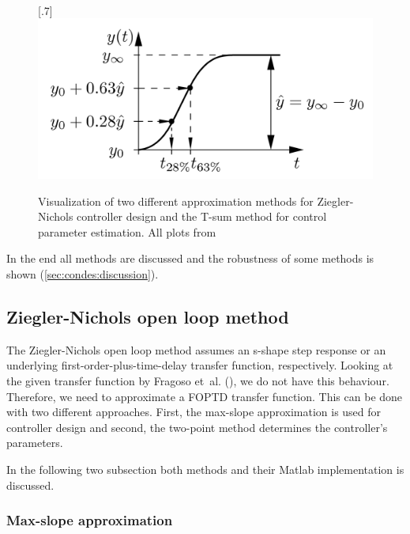 \begin{figure}[H]
\\
[.7\textwidth]{\includegraphics[width=1\linewidth]{fig/Dissli_Kienle_two_point_2023.png}}
    \caption{Visualization of two different approximation methods for Ziegler-Nichols controller design and the T-sum method for control parameter estimation. All plots from \cite{Dissli_Kienle_2023}}
    \label{fig:condes:different_methods}
\end{figure}



In the end all methods are discussed and the robustness of some methods is shown (\autoref{sec:condes:discussion}).



\subsection{Ziegler-Nichols open loop method}\label{sec:condes:ZN}

The Ziegler-Nichols open loop method assumes an s-shape step response or an underlying first-order-plus-time-delay transfer function, respectively.
Looking at the given transfer function by Fragoso et~al. (\cite[Table 2]{Fragoso_et_al_2017}), we do not have this behaviour.
Therefore, we need to approximate a FOPTD transfer function.
This can be done with two different approaches.
First, the max-slope approximation is used for controller design and second, the two-point method determines the controller's parameters.

In the following two subsection both methods and their Matlab implementation is discussed. 


\subsubsection{Max-slope approximation} \label{sec:condes:ZN:maxS}

